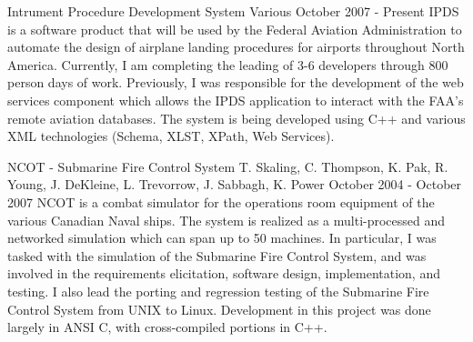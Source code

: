 %
%
%
%
%


\resumeproject
{Intrument Procedure Development System}
{Various}
{October 2007 - Present}
{IPDS is a software product that will be used by the Federal Aviation Administration to automate the design of airplane landing procedures for airports throughout North America. Currently, I am completing the leading of 3-6 developers through 800 person days of work. Previously, I was responsible for the development of the web services component which allows the IPDS application to interact with the FAA's remote aviation databases. The system is being developed using C++ and various XML technologies (Schema, XLST, XPath, Web Services).}

\resumeproject
{NCOT - Submarine Fire Control System}
{T. Skaling, C. Thompson, K. Pak, R. Young, J. DeKleine, L. Trevorrow, J. Sabbagh, K. Power}
{October 2004 - October 2007}
{NCOT is a combat simulator for the operations room equipment of the various Canadian Naval ships. The system is realized as a multi-processed and networked simulation which can span up to 50 machines. In particular, I was tasked with the simulation of the Submarine Fire Control System, and was involved in the requirements elicitation, software design, implementation, and testing. %
I also lead the porting and regression testing of the Submarine Fire Control System from UNIX to Linux. Development in this project was done largely in ANSI C,  with cross-compiled portions in C++.}



